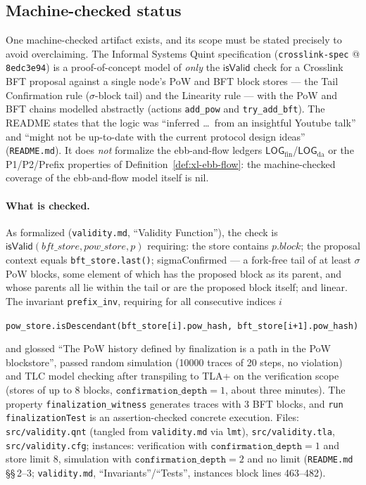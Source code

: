 \documentclass[11pt,a4paper]{article}
\theoremstyle{definition}
\begin{document}
\subsection{Machine-checked status}\label{sec:xl-machine-checked}

One machine-checked artifact exists, and its scope must be stated
precisely to avoid overclaiming. The Informal Systems Quint specification
(\texttt{crosslink-spec} @ \texttt{8edc3e94}) is a proof-of-concept model
of \emph{only} the $\mathsf{isValid}$ check for a Crosslink BFT proposal
against a single node's PoW and BFT block stores --- the Tail Confirmation
rule ($\sigma$-block tail) and the Linearity rule --- with the PoW and BFT
chains modelled abstractly (actions \texttt{add\_pow} and
\texttt{try\_add\_bft}). The README states that the logic was ``inferred
\dots\ from an insightful Youtube talk'' and ``might not be up-to-date
with the current protocol design ideas'' (\texttt{README.md}). It does
\emph{not} formalize the ebb-and-flow ledgers
$\mathsf{LOG}_{\mathrm{fin}}$/$\mathsf{LOG}_{\mathrm{da}}$ or the
P1/P2/Prefix properties of Definition~\ref{def:xl-ebb-flow}: the
machine-checked coverage of the ebb-and-flow model itself is nil.

\paragraph{What is checked.} As formalized
(\texttt{validity.md}, ``Validity Function''), the check is
$\mathsf{isValid}(\mathit{bft\_store},\allowbreak
\mathit{pow\_store},\allowbreak p)$ requiring:
the store contains $p.\mathit{block}$; the proposal context equals
\texttt{bft\_store.last()}; \textsf{sigmaConfirmed} --- a fork-free tail
of at least $\sigma$ PoW blocks, some element of which has the proposed
block as its parent, and whose parents all lie within the tail or are the
proposed block itself; and
\textsf{linear}. The
invariant \texttt{prefix\_inv}, requiring for all consecutive indices $i$
\begin{center}
\texttt{pow\_store.isDescendant(bft\_store[i].pow\_hash,
bft\_store[i+1].pow\_hash)}
\end{center}
and glossed ``The PoW history defined by finalization is a path in the
PoW blockstore'', passed random
simulation (10000 traces of 20 steps, no violation) and TLC model
checking after transpiling to TLA+ on the verification scope (stores of
up to 8 blocks, $\mathtt{confirmation\_depth} = 1$, about three minutes).
The property \texttt{finalization\_witness} generates traces with 3 BFT
blocks, and \texttt{run finalizationTest} is an assertion-checked
concrete execution. Files: \texttt{src/validity.qnt} (tangled from
\texttt{validity.md} via \texttt{lmt}), \texttt{src/validity.tla},
\texttt{src/validity.cfg}; instances: verification with
$\mathtt{confirmation\_depth} = 1$ and store limit 8, simulation with
$\mathtt{confirmation\_depth} = 2$ and no limit (\texttt{README.md}
\S\S\,2--3; \texttt{validity.md}, ``Invariants''/``Tests'', instances
block lines 463--482).
\end{document}
